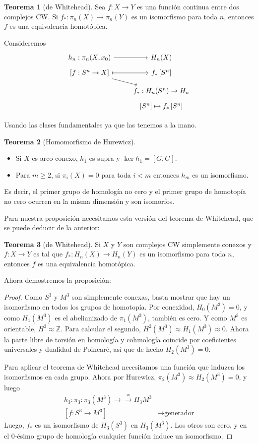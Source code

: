 \documentclass[spanish]{book}
\theoremstyle{definition}
\newtheorem*{teo}{Teorema}
\newcommand{\Z}{\mathbb{Z}}
\begin{document}
\begin{teo}[de Whitehead]
	Sea $f:X\to Y$ es una función continua entre dos complejos CW. Si $f_*:\pi_n(X)\to \pi_n(Y)$ es un isomorfismo para toda $n$, entonces $f$ es una equivalencia homotópica.
\end{teo}

Consideremos
\[\begin{tikzcd}[row sep=tiny]
	h_n:\pi_n(X,x_0)\arrow[r]&H_n(X)\\
	\left[f:S^n\to X\right]\arrow[r,maps to]\arrow[ddr]&f_*\left[S^n\right]\\ \\
	&f_*:H_n(S^n)\to H_n\\
	&\left[S^n\right]\mapsto f_*\left[S^n\right]
\end{tikzcd}\]

Usando las clases fundamentales ya que las tenemos a la mano.

\begin{teo}[Homomorfismo de Hurewicz]\leavevmode
	\begin{itemize}
		\item Si $X$ es arco-conexo, $h_1$ es supra y $\ker h_1=[G,G]$.
		\item Para $m\geq2$, si $\pi_i(X)=0$ para toda $i<m$ entonces $h_m$ es un isomorfismo.
	\end{itemize}
\end{teo}
Es decir, el primer grupo de homología no cero y el primer grupo de homotopía no cero ocurren en la misma dimensión y son isomorfos.

Para nuestra proposición necesitamos esta versión del teorema de Whitehead, que se puede deducir de la anterior:

\begin{teo}[de Whitehead]
	Si $X$ y $Y$ son complejos CW simplemente conexos y $f:X\to Y$ es tal que $f_*:H_n(X)\to H_n(Y)$ es un isomorfismo para toda $n$, entonces $f$ es una equivalencia homotópica.
\end{teo}

Ahora demostremos la proposición:
\begin{proof}
	Como $S^3$ y $M^3$ son simplemente conexas, basta mostrar que hay un isomorfismo en todos los grupos de homotopía. Por conexidad, $H_0(M^3)=0$, y como $H_1(M^3)$ es el abelianizado de $\pi_1(M^3)$, también es cero. Y como $M^3$ es orientable, $H^3\approx \Z$. Para calcular el segundo, $H^2(M^3)\approx H_1(M^3)\approx 0$. Ahora la parte libre de torsión en homología y cohmología coincide por coeficientes universales y dualidad de Poincaré, así que de hecho $H_2(M^3)=0$.
	
	Para aplicar el teorema de Whitehead necesitamos una función que induzca los isomorfismos en cada grupo. Ahora por Hurewicz, $\pi_2(M^3)\approx H_2(M^3)=0$, y luego
	\begin{align*}
		h_3:\pi_3:\pi_3(M^3)\to\overset{\approx}{\to} H_3{M^3}\\
		[f:S^3\to M^3]&\mapsto \text{generador}
	\end{align*}
	Luego, $f_*$ es un isomorfismo de $H_3(S^3)$ en $H_3(M^3)$. Los otros son cero, y en el 0-ésimo grupo de homología cualquier función induce un isomorfismo.
\end{proof}
\end{document}
